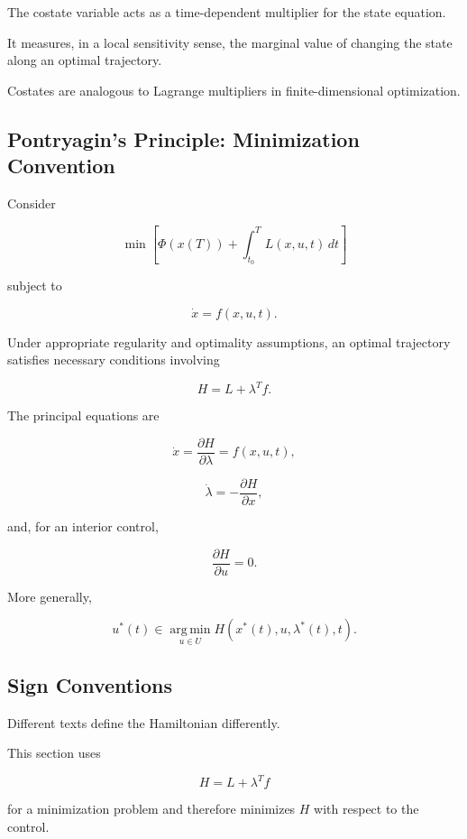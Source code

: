 The costate variable acts as a time-dependent multiplier for the state
equation.

It measures, in a local sensitivity sense, the marginal value of changing
the state along an optimal trajectory.

Costates are analogous to Lagrange multipliers in finite-dimensional
optimization.

\subsection{Pontryagin's Principle: Minimization Convention}
\label{subsec:pontryagin-principle}

Consider

\[
\min
\left[
\Phi(x(T))
+
\int_{t_0}^{T}
L(x,u,t)\,dt
\right]
\]

subject to

\[
\dot{x}=f(x,u,t).
\]

Under appropriate regularity and optimality assumptions, an optimal
trajectory satisfies necessary conditions involving

\[
H
=
L+\lambda^Tf.
\]

The principal equations are

\[
\boxed{
\dot{x}
=
\frac{\partial H}{\partial\lambda}
=
f(x,u,t),
}
\]

\[
\boxed{
\dot{\lambda}
=
-
\frac{\partial H}{\partial x},
}
\]

and, for an interior control,

\[
\boxed{
\frac{\partial H}{\partial u}
=
0.
}
\]

More generally,

\[
\boxed{
u^*(t)
\in
\operatorname*{arg\,min}_{u\in U}
H
(
x^*(t),
u,
\lambda^*(t),
t
).
}
\]

\subsection{Sign Conventions}
\label{subsec:optimal-control-sign-conventions}

Different texts define the Hamiltonian differently.

This section uses

\[
\boxed{
H
=
L+\lambda^Tf
}
\]

for a minimization problem and therefore minimizes \(H\) with respect to
the control.

